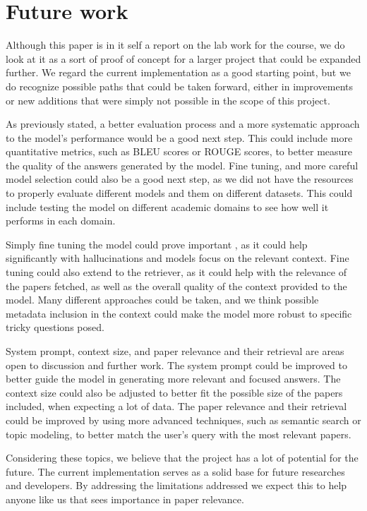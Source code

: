 \documentclass[fleqn,moreauthors,10pt]{ds_report}
\begin{document}
\section*{Future work}

Although this paper is in it self a report on the lab work for the course, we do look at it as a sort of proof of concept for a larger project that could be expanded further. We regard the current implementation as a good starting point, but we do recognize possible paths that could be taken forward, either in improvements or new additions that were simply not possible in the scope of this project.

As previously stated, a better evaluation process and a more systematic approach to the model's performance would be a good next step. This could include more quantitative metrics, such as BLEU scores or ROUGE scores, to better measure the quality of the answers generated by the model. Fine tuning, and more careful model selection could also be a good next step, as we did not have the resources to properly evaluate different models and them on different datasets. This could include testing the model on different academic domains to see how well it performs in each domain.

Simply fine tuning the model could prove important \cite{chen2024honestaifinetuningsmall}, as it could help significantly with hallucinations and models focus on the relevant context. Fine tuning could also extend to the retriever, as it could help with the relevance of the papers fetched, as well as the overall quality of the context provided to the model. Many different approaches could be taken, and we think possible metadata inclusion in the context could make the model more robust to specific tricky questions posed.

System prompt, context size, and paper relevance and their retrieval are areas open to discussion and further work. The system prompt could be improved to better guide the model in generating more relevant and focused answers. The context size could also be adjusted to better fit the possible size of the papers included, when expecting a lot of data. The paper relevance and their retrieval could be improved by using more advanced techniques, such as semantic search or topic modeling, to better match the user's query with the most relevant papers.

Considering these topics, we believe that the project has a lot of potential for the future. The current implementation serves as a solid base for future researches and developers. By addressing the limitations addressed we expect this to help anyone like us that sees importance in paper relevance.
\end{document}

